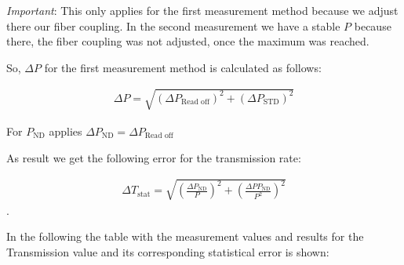 \textit{Important}: This only applies for the first measurement method because we adjust there our fiber coupling.
In the second measurement we have a stable $P$ because there, the fiber coupling was not adjusted, once the maximum was
reached.

So, $\Delta P$ for the first measurement method is calculated as follows:

\begin{align}
    \Delta P = \sqrt{(\Delta P_{\text{Read off}})^2 + (\Delta P_{\text{STD}})^2}
\end{align}

For $P_{\text{ND}}$ applies $\Delta P_{\text{ND}} = \Delta P_{\text{Read off}}$

As result we get the following error for the transmission rate:

\begin{align}
    \Delta T_{\text{stat}}= \sqrt{\left(\frac{\Delta P_{\text{ND}}}{P}\right)^2 + \left(\frac{\Delta P P_{\text{ND}}}{ P^2}\right)^2}
\end{align}.

In the following the table with the measurement values and results for the Transmission value and its corresponding statistical
error is shown:




